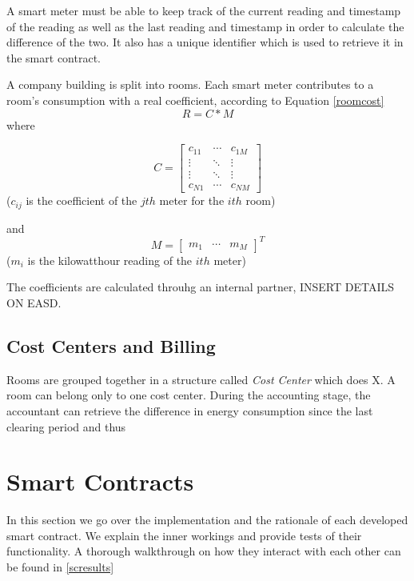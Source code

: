 A smart meter must be able to keep track of the current reading and timestamp of the reading as well as the last reading and timestamp in order to calculate the difference of the two. It also has a unique identifier which is used to retrieve it in the smart contract.

A company building is split into rooms. Each smart meter contributes to a room's consumption with a real coefficient, according to Equation \ref{roomcost}
\begin{equation}\label{roomcost}
R = C * M
\end{equation}
\noindent where
\begin{description}
\item  \[C = 
\begin{bmatrix}
    c_{11} & \cdots & c_{1M} \\
    \vdots & \ddots & \vdots \\ 
    \vdots & \ddots & \vdots \\
    c_{N1} & \cdots & c_{NM}
  \end{bmatrix}\] ($c_{ij}$ is the coefficient of the $jth$ meter for the $ith$ room)

\item  and \[M = 
\begin{bmatrix}
    m_{1} & \cdots & m_{M}
\end{bmatrix}^T\] ($m_{i}$ is the kilowatthour reading of the $ith$ meter)
\end{description}

The coefficients are calculated throuhg an internal partner, INSERT DETAILS ON EASD.

\subsection{Cost Centers and Billing}

Rooms are grouped together in a structure called \textit{Cost Center} which does X. A room can belong only to one cost center. During the accounting stage, the accountant can retrieve the difference in energy consumption since the last clearing period and thus


\section{Smart Contracts}

In this section we go over the implementation and the rationale of each developed smart contract. We explain the inner workings and provide tests of their functionality. A thorough walkthrough on how they interact with each other can be found in \ref{scresults}
